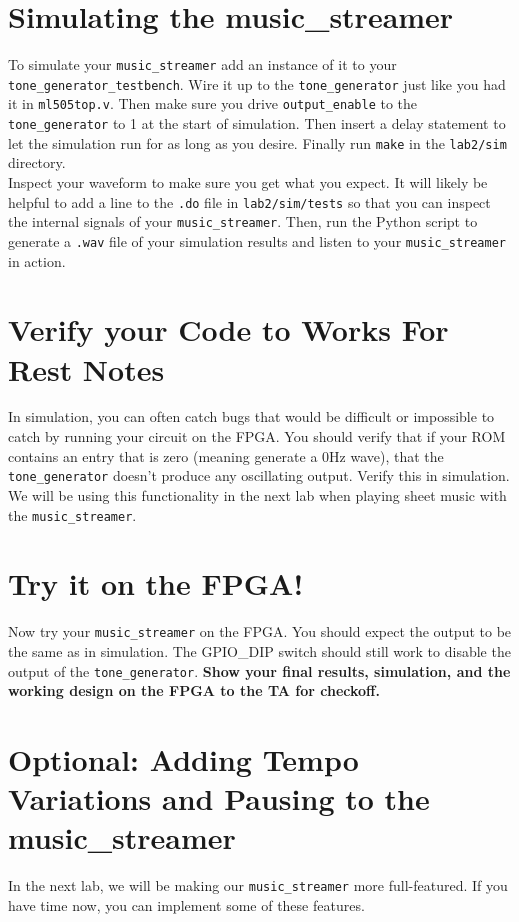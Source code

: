 \documentclass[11pt]{article}
\begin{document}
\section{Simulating the music\_streamer}
To simulate your \verb|music_streamer| add an instance of it to your \verb|tone_generator_testbench|. Wire it up to the \verb|tone_generator| just like you had it in \verb|ml505top.v|. Then make sure you drive \verb|output_enable| to the \verb|tone_generator| to 1 at the start of simulation. Then insert a delay statement to let the simulation run for as long as you desire. Finally run \verb|make| in the \verb|lab2/sim| directory.\\

Inspect your waveform to make sure you get what you expect. It will likely be helpful to add a line to the \verb|.do| file in \verb|lab2/sim/tests| so that you can inspect the internal signals of your \verb|music_streamer|. Then, run the Python script to generate a \verb|.wav| file of your simulation results and listen to your \verb|music_streamer| in action.

\section{Verify your Code to Works For Rest Notes}
In simulation, you can often catch bugs that would be difficult or impossible to catch by running your circuit on the FPGA. You should verify that if your ROM contains an entry that is zero (meaning generate a 0Hz wave), that the \verb|tone_generator| doesn't produce any oscillating output. Verify this in simulation. We will be using this functionality in the next lab when playing sheet music with the \verb|music_streamer|.

\section{Try it on the FPGA!}
Now try your \verb|music_streamer| on the FPGA. You should expect the output to be the same as in simulation. The GPIO\_DIP switch should still work to disable the output of the \verb|tone_generator|. \textbf{Show your final results, simulation, and the working design on the FPGA to the TA for checkoff.}

\section{Optional: Adding Tempo Variations and Pausing to the music\_streamer}
In the next lab, we will be making our \verb|music_streamer| more full-featured. If you have time now, you can implement some of these features.\\
\end{document}

